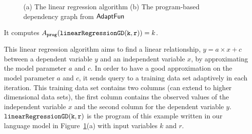 \begin{example}
\begin{figure}
\begin{subfigure}{.55\textwidth}
\begin{centering}
         \caption{}
            \end{centering}
            \end{subfigure}
    \vspace{-0.5cm}
    \caption{(a) The linear regression algorithm 
    (b) The program-based dependency graph from $\textsf{AdaptFun}$}
    \vspace{-0.5cm}
    \label{fig:linear_regression}
\end{figure}
%
It computes $ A_{\mathtt{prog}}(\mathtt{linearRegressionGD(k, r)}) = k$.
\end{example} 
%
This linear regression algorithm 
aims to
find a linear relationship, $y = a \times x + c$ between a dependent variable $y$
and an independent variable $x$, by approximating the 
model parameter $a$ and $c$.
In order to have a good approximation on the model parameter 
$a$ and $c$, 
it sends query to a training data set adaptively in each iteration.
This training data set contains two columns (can extend to higher dimensional data sets), 
the first column contains the observed values of the independent variable $x$ and the
second column for the dependent variable $y$.
$\mathtt{linearRegressionGD(k, r)}$ is the program of this example written in our language model in Figure~\ref{fig:linear_regression}(a)
with input variables $k$ and $r$.

